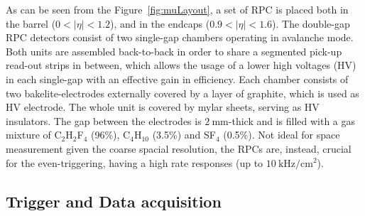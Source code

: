 As can be seen from the Figure~\ref{fig:muLayout}, a set of RPC is placed both in the barrel ($0<|\eta|<1.2$), 
and in the endcaps ($0.9<|\eta|<1.6$). The double-gap RPC detectors consist of two single-gap chambers operating in avalanche mode. 
Both units are assembled back-to-back in order to share a segmented pick-up read-out strips 
in between, which allows the usage of a lower high voltages (HV) in each single-gap with an effective gain in efficiency. 
Each chamber consists of two bakelite-electrodes externally covered by a layer of graphite, which is used
as HV electrode. The whole unit is covered by mylar sheets, serving as HV insulators.
The gap between the electrodes is $2~\si{\mm}$-thick and is filled with a gas mixture of C$_2$H$_2$F$_4$ (96\%), 
C$_4$H$_{10}$ (3.5\%) and SF$_4$ (0.5\%). Not ideal for space measurement given the coarse spacial resolution, 
the RPCs are, instead, crucial for the even-triggering, having a high rate responses (up to $10~\si{\kilo\hertz}/\si{\cm}^2$).


\subsection{Trigger and Data acquisition}
\label{subsec:triDAQ}

















